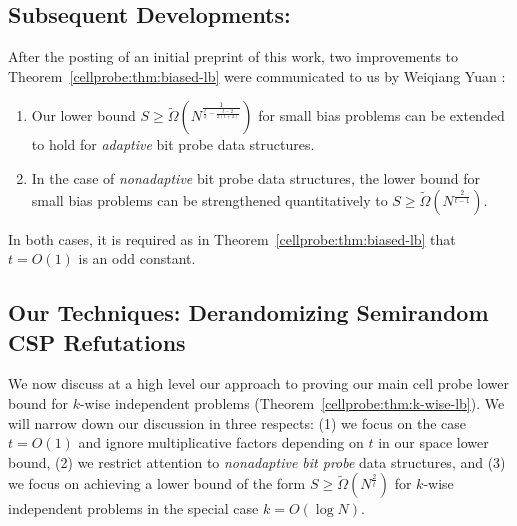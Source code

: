 \subsection{Subsequent Developments:}
After the posting of an initial preprint of this work, two improvements to Theorem~\ref{cellprobe:thm:biased-lb} were communicated to us by Weiqiang Yuan \cite{weiqiang}:
\begin{enumerate}
    \item Our lower bound $S \geq \tilde{\Omega}(N^{\frac{1}{\frac{t}{2} - \frac{t-2}{2(t+2)}}})$ for small bias problems can be extended to hold for \emph{adaptive} bit probe data structures.
    \item In the case of \emph{nonadaptive} bit probe data structures, the lower bound for small bias problems can be strengthened quantitatively to $S \geq \tilde{\Omega}(N^{\frac{2}{t-1}})$. 
\end{enumerate}
In both cases, it is required as in Theorem~\ref{cellprobe:thm:biased-lb} that $t=O(1)$ is an odd constant.

\subsection{Our Techniques: Derandomizing Semirandom CSP Refutations}

We now discuss at a high level our approach to proving our main cell probe lower bound for $k$-wise independent problems (Theorem~\ref{cellprobe:thm:k-wise-lb}). We will narrow down our discussion in three respects: (1) we focus on the case $t= O(1)$ and ignore multiplicative factors depending on $t$ in our space lower bound, (2) we restrict attention to \emph{nonadaptive bit probe} data structures, and (3) we focus on achieving a lower bound of the form $S \geq \tilde{\Omega}(N^{\frac{2}{t}})$ for $k$-wise independent problems in the special case $k = O(\log N)$.

